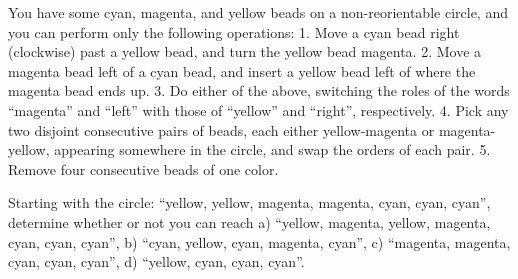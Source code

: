 You have some cyan, magenta, and yellow beads on a non-reorientable circle, and you can perform only the following operations:
1. Move a cyan bead right (clockwise) past a yellow bead, and turn the yellow bead magenta.
2. Move a magenta bead left of a cyan bead, and insert a yellow bead left of where the magenta bead ends up.
3. Do either of the above, switching the roles of the words ``magenta'' and ``left'' with those of ``yellow'' and ``right'', respectively.
4. Pick any two disjoint consecutive pairs of beads, each either yellow-magenta or magenta-yellow, appearing somewhere in the circle, and swap the orders of each pair.
5. Remove four consecutive beads of one color.


Starting with the circle: ``yellow, yellow, magenta, magenta, cyan, cyan, cyan'', determine whether or not you can reach
a) ``yellow, magenta, yellow, magenta, cyan, cyan, cyan'',
b) ``cyan, yellow, cyan, magenta, cyan'',
c) ``magenta, magenta, cyan, cyan, cyan'',
d) ``yellow, cyan, cyan, cyan''.

